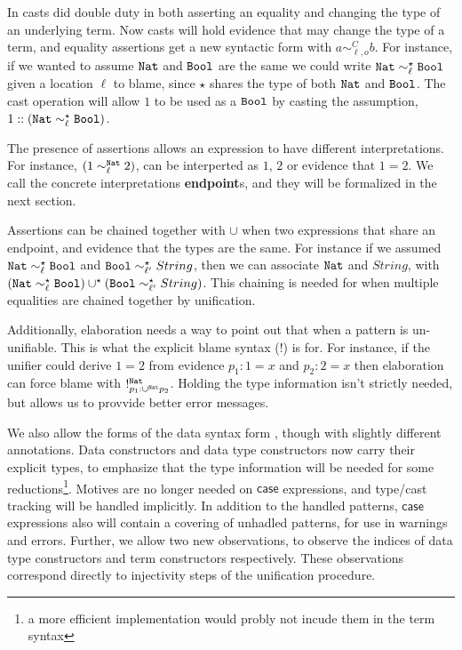 In  casts did double duty in both asserting an equality and changing the type of an underlying term.
Now casts will hold evidence that may change the type of a term, and equality assertions get a new syntactic form with $a\sim_{\ell,o}^{C}b$.
For instance, if we wanted to assume $\mathtt{Nat}{} $ and $\mathtt{Bool}{} $ are the same we could write $\mathtt{Nat}{} \sim_{\ell}^{\star}\mathtt{Bool}{} $ given a location $\ell$ to blame, since $\star$ shares the type of both $\mathtt{Nat}{} $ and $\mathtt{Bool}{} $.
The cast operation will allow $1$ to be used as a $\mathtt{Bool}{} $ by casting the assumption, $1::\left(\mathtt{Nat}{} \sim_{\ell}^{\star}\mathtt{Bool}{} \right)$.

The presence of assertions allows an expression to have different interpretations.
For instance, $\left(1 \sim_{\ell}^{\mathtt{Nat}{}} 2 \right)$, can be interperted as $1$, $2$ or evidence that $1=2$.
We call the concrete interpretations \textbf{endpoint}s, and they will be formalized in the next section.

Assertions can be chained together with $\cup$ when two expressions that share an endpoint, and evidence that the types are the same.
For instance if we assumed $\mathtt{Nat}{} \sim_{\ell}^{\star}\mathtt{Bool}{} $ and $\mathtt{Bool}{} \sim_{\ell'}^{\star}String$, then we can associate $\mathtt{Nat}{} $ and $String$, with $\left(\mathtt{Nat}{} \sim_{\ell}^{\star}\mathtt{Bool}{} \right)\cup^{\star}\left(\mathtt{Bool}{} \sim_{\ell'}^{\star}String\right)$.
This chaining is needed for when multiple equalities are chained together by unification.

Additionally, elaboration needs a way to point out that when a pattern is un-unifiable.
This is what the explicit blame syntax ($!$) is for.
For instance, if the unifier could derive $1=2$ from evidence $p_{1}:1=x$ and $p_{2}:2=x$ then elaboration can force blame with $!_{p_{1}:\cup^{\mathtt{Nat}{}}p_{2}}^{\mathtt{Nat}{}}$.
Holding the type information isn't strictly needed, but allows us to provvide better error messages.
 
We also allow the forms of the data syntax form , though with slightly different annotations.
Data constructors and data type constructors now carry their explicit types, to emphasize that the type information will be needed for some reductions\footnote{
  a more efficient implementation would probly not incude them in the term syntax}.
Motives are no longer needed on $\mathsf{case}$ expressions, and type/cast tracking will be handled implicitly.
In addition to the handled patterns, $\mathsf{case}$ expressions also will contain a covering of unhadled patterns, for use in warnings and errors.
Further, we allow two new observations, to observe the indices of data type constructors and term constructors respectively.
These observations correspond directly to injectivity steps of the unification procedure.
 
